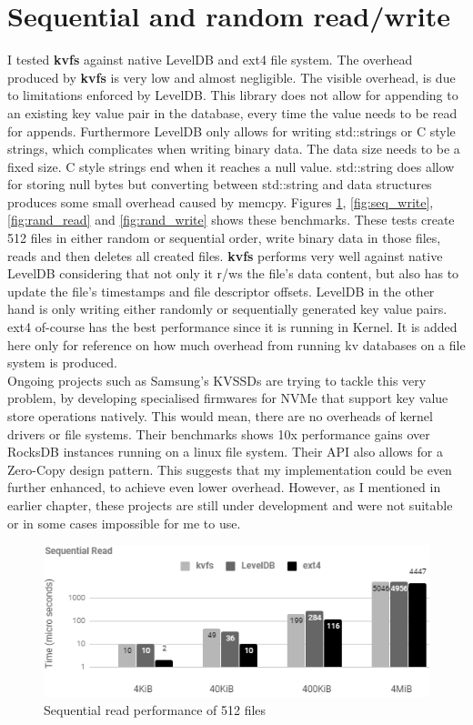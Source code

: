 \documentclass[bsc,frontabs,twoside,singlespacing,parskip,deptreport]{infthesis}     %
\begin{document}
{\section{Sequential and random read/write}
I tested {\bf kvfs} against native LevelDB and ext4 file system. The overhead produced by {\bf kvfs} is very low and almost negligible. The visible overhead, is due to limitations enforced by LevelDB. This library does not allow for appending to an existing key value pair in the database, every time the value needs to be read for appends. Furthermore LevelDB only allows for writing std::strings or C style strings, which complicates when writing binary data. The data size needs to be a fixed size. C style strings end when it reaches a null value. std::string does allow for storing null bytes but converting between std::string and data structures produces some small overhead caused by memcpy.
Figures \ref{fig:seq_read}, \ref{fig:seq_write}, \ref{fig:rand_read} and \ref{fig:rand_write}  shows these benchmarks. These tests create 512 files in either random or sequential order, write binary data in those files, reads and then deletes all created files. 
{\bf kvfs} performs very well against native LevelDB considering that not only it r/ws the file's data content, but also has to update the file's timestamps and file descriptor offsets. LevelDB in the other hand is only writing either randomly or sequentially generated key value pairs. ext4 of-course has the best performance since it is running in Kernel. It is added here only for reference on how much overhead from running kv databases on a file system is produced.
\\
Ongoing projects such as Samsung's KVSSDs \cite{samsung_kv_ssd} are trying to tackle this very problem, by developing specialised firmwares for NVMe that support key value store operations natively. This would mean, there are no overheads of kernel drivers or file systems. Their benchmarks shows 10x performance gains over RocksDB instances running on a linux file system.  Their API also allows for a Zero-Copy design pattern. This suggests that my implementation could be even further enhanced, to achieve even lower overhead. However, as I mentioned in earlier chapter, these projects are still under development and were not suitable or in some cases impossible for me to use.
\begin{figure}[h!]
	\centering
	\includegraphics[scale=1]{diagrams/seq_read.png}
	\caption{Sequential read performance of 512 files}
	 \label{fig:seq_read}
\end{figure}

}
\end{document}
